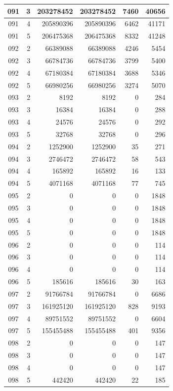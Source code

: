 \begin{longtable}{|c|r|r|r|r|r|}
\hline
091 & 3 & 203278452 & 203278452 & 7460 & 40656 \\
\hline
091 & 4 & 205890396 & 205890396 & 6462 & 41171 \\
\hline
091 & 5 & 206475368 & 206475368 & 8332 & 41248 \\
\hline
092 & 2 & 66389088 & 66389088 & 4246 & 5454 \\
\hline
092 & 3 & 66784736 & 66784736 & 3799 & 5400 \\
\hline
092 & 4 & 67180384 & 67180384 & 3688 & 5346 \\
\hline
092 & 5 & 66980256 & 66980256 & 3274 & 5070 \\
\hline
093 & 2 & 8192 & 8192 & 0 & 284 \\
\hline
093 & 3 & 16384 & 16384 & 0 & 288 \\
\hline
093 & 4 & 24576 & 24576 & 0 & 292 \\
\hline
093 & 5 & 32768 & 32768 & 0 & 296 \\
\hline
094 & 2 & 1252900 & 1252900 & 35 & 271 \\
\hline
094 & 3 & 2746472 & 2746472 & 58 & 543 \\
\hline
094 & 4 & 165892 & 165892 & 16 & 133 \\
\hline
094 & 5 & 4071168 & 4071168 & 77 & 745 \\
\hline
095 & 2 & 0 & 0 & 0 & 1848 \\
\hline
095 & 3 & 0 & 0 & 0 & 1848 \\
\hline
095 & 4 & 0 & 0 & 0 & 1848 \\
\hline
095 & 5 & 0 & 0 & 0 & 1848 \\
\hline
096 & 2 & 0 & 0 & 0 & 114 \\
\hline
096 & 3 & 0 & 0 & 0 & 114 \\
\hline
096 & 4 & 0 & 0 & 0 & 114 \\
\hline
096 & 5 & 185616 & 185616 & 30 & 163 \\
\hline
097 & 2 & 91766784 & 91766784 & 0 & 6686 \\
\hline
097 & 3 & 161925120 & 161925120 & 828 & 9193 \\
\hline
097 & 4 & 89751552 & 89751552 & 0 & 6604 \\
\hline
097 & 5 & 155455488 & 155455488 & 401 & 9356 \\
\hline
098 & 2 & 0 & 0 & 0 & 147 \\
\hline
098 & 3 & 0 & 0 & 0 & 147 \\
\hline
098 & 4 & 0 & 0 & 0 & 147 \\
\hline
098 & 5 & 442420 & 442420 & 22 & 185 \\

\end{longtable}
